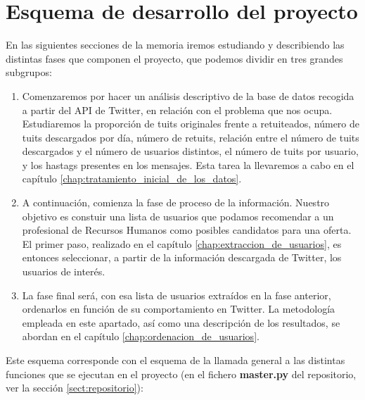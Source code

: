 \section{Esquema de desarrollo del proyecto}
En las siguientes secciones de la memoria iremos estudiando y describiendo las distintas
fases que componen el proyecto, que podemos dividir en tres grandes subgrupos:
\begin{enumerate}
\item Comenzaremos por hacer un análisis descriptivo de la base de datos recogida a partir del API de Twitter, en relación con el problema que nos ocupa. Estudiaremos la proporción de tuits originales
frente a retuiteados, número de tuits descargados por día, número de retuits, relación entre el 
número de tuits descargados y el número de usuarios distintos, el número de tuits por usuario, y
los hastags presentes en los mensajes. Esta tarea la llevaremos a cabo en el capítulo \ref{chap:tratamiento_inicial_de_los_datos}.

\item A continuación, comienza la fase de proceso de la información. Nuestro objetivo es 
constuir una lista de usuarios que podamos recomendar a un profesional de Recursos Humanos como
posibles candidatos para una oferta. El primer paso, realizado en el capítulo \ref{chap:extraccion_de_usuarios}, es entonces seleccionar, a partir de la información descargada de Twitter, los usuarios de interés. 

\item La fase final será, con esa lista de usuarios extraídos en la fase anterior, ordenarlos
en función de su comportamiento en Twitter. La metodología empleada en este apartado, así como una descripción de los resultados, se abordan en el capítulo \ref{chap:ordenacion_de_usuarios}.
\end{enumerate}

Este esquema corresponde con el esquema de la llamada general a las distintas funciones que se
ejecutan en el proyecto (en el fichero {\bf master.py} del repositorio, ver la sección
\ref{sect:repositorio}):

